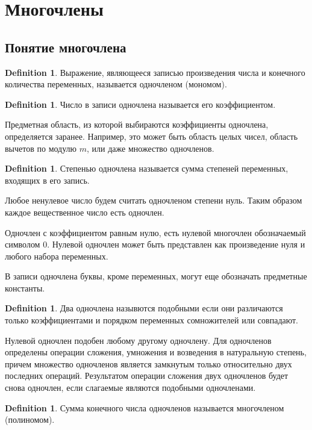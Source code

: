 \documentclass[letterpaper, 10pt]{article}
\theoremstyle{definition}
\newtheorem{define}[thm]{Definition}
\begin{document}
\section{Многочлены}	
\subsection{Понятие многочлена}
\begin{define}
Выражение, являющееся записью произведения числа и конечного количества
переменных, называется одночленом (мономом).
\end{define}

\begin{define}
Число в записи одночлена называется его коэффициентом.
\end{define}

Предметная область, из которой выбираются коэффициенты одночлена, определяется
заранее. Например, это может быть область целых чисел, область вычетов по модулю
$m$, или даже множество одночленов.

\begin{define}
Степенью одночлена называется сумма степеней переменных, входящих в его запись.
\end{define}

Любое ненулевое число будем считать одночленом степени нуль. Таким образом
каждое вещественное число есть одночлен.

Одночлен с коэффициентом равным нулю, есть нулевой многочлен обозначаемый
символом $0$. Нулевой одночлен может быть представлен как произведение нуля и
любого набора переменных.

В записи одночлена буквы, кроме переменных, могут еще обозначать предметные
константы.

\begin{define}
Два одночлена назывются подобными если они различаются только коэффициентами и
порядком переменных сомножителей или совпадают.
\end{define}

Нулевой одночлен подобен любому другому одночлену.
Для одночленов определены операции сложения, умножения и возведения в
натуральную степень, причем множество одночленов является замкнутым только
относительно двух последних операций. Результатом операции сложения двух
одночленов будет снова одночлен, если слагаемые являются подобными одночленами.

\begin{define}
Сумма конечного числа одночленов называется многочленом (полиномом).
\end{define}
\end{document}
